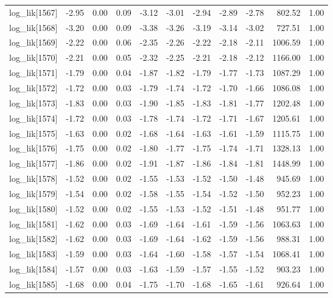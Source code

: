 \begin{table}[ht]
\begin{tabular}{rrrrrrrrrrr}
  log\_lik[1567] & -2.95 & 0.00 & 0.09 & -3.12 & -3.01 & -2.94 & -2.89 & -2.78 & 802.52 & 1.00 \\ 
  log\_lik[1568] & -3.20 & 0.00 & 0.09 & -3.38 & -3.26 & -3.19 & -3.14 & -3.02 & 727.51 & 1.00 \\ 
  log\_lik[1569] & -2.22 & 0.00 & 0.06 & -2.35 & -2.26 & -2.22 & -2.18 & -2.11 & 1006.59 & 1.00 \\ 
  log\_lik[1570] & -2.21 & 0.00 & 0.05 & -2.32 & -2.25 & -2.21 & -2.18 & -2.12 & 1166.00 & 1.00 \\ 
  log\_lik[1571] & -1.79 & 0.00 & 0.04 & -1.87 & -1.82 & -1.79 & -1.77 & -1.73 & 1087.29 & 1.00 \\ 
  log\_lik[1572] & -1.72 & 0.00 & 0.03 & -1.79 & -1.74 & -1.72 & -1.70 & -1.66 & 1086.08 & 1.00 \\ 
  log\_lik[1573] & -1.83 & 0.00 & 0.03 & -1.90 & -1.85 & -1.83 & -1.81 & -1.77 & 1202.48 & 1.00 \\ 
  log\_lik[1574] & -1.72 & 0.00 & 0.03 & -1.78 & -1.74 & -1.72 & -1.71 & -1.67 & 1205.61 & 1.00 \\ 
  log\_lik[1575] & -1.63 & 0.00 & 0.02 & -1.68 & -1.64 & -1.63 & -1.61 & -1.59 & 1115.75 & 1.00 \\ 
  log\_lik[1576] & -1.75 & 0.00 & 0.02 & -1.80 & -1.77 & -1.75 & -1.74 & -1.71 & 1328.13 & 1.00 \\ 
  log\_lik[1577] & -1.86 & 0.00 & 0.02 & -1.91 & -1.87 & -1.86 & -1.84 & -1.81 & 1448.99 & 1.00 \\ 
  log\_lik[1578] & -1.52 & 0.00 & 0.02 & -1.55 & -1.53 & -1.52 & -1.50 & -1.48 & 945.69 & 1.00 \\ 
  log\_lik[1579] & -1.54 & 0.00 & 0.02 & -1.58 & -1.55 & -1.54 & -1.52 & -1.50 & 952.23 & 1.00 \\ 
  log\_lik[1580] & -1.52 & 0.00 & 0.02 & -1.55 & -1.53 & -1.52 & -1.51 & -1.48 & 951.77 & 1.00 \\ 
  log\_lik[1581] & -1.62 & 0.00 & 0.03 & -1.69 & -1.64 & -1.61 & -1.59 & -1.56 & 1063.63 & 1.00 \\ 
  log\_lik[1582] & -1.62 & 0.00 & 0.03 & -1.69 & -1.64 & -1.62 & -1.59 & -1.56 & 988.31 & 1.00 \\ 
  log\_lik[1583] & -1.59 & 0.00 & 0.03 & -1.64 & -1.60 & -1.58 & -1.57 & -1.54 & 1068.41 & 1.00 \\ 
  log\_lik[1584] & -1.57 & 0.00 & 0.03 & -1.63 & -1.59 & -1.57 & -1.55 & -1.52 & 903.23 & 1.00 \\ 
  log\_lik[1585] & -1.68 & 0.00 & 0.04 & -1.75 & -1.70 & -1.68 & -1.65 & -1.61 & 926.64 & 1.00 \\ 

\end{tabular}
\end{table}
